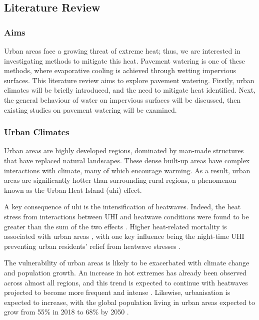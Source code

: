 \documentclass[final,3p,times,authoryear]{elsarticle}
\begin{document}
\subsection{Literature Review}\label{sec:appendix7.1}
\subsubsection{Aims}\label{sec:appendix7.1.1}

Urban areas face a growing threat of extreme heat; thus, we are interested in investigating methods to mitigate this heat. Pavement watering is one of these methods, where evaporative cooling is achieved through wetting impervious surfaces. This literature review aims to explore pavement watering. Firstly, urban climates will be briefly introduced, and the need to mitigate heat identified. Next, the general behaviour of water on impervious surfaces will be discussed, then existing studies on pavement watering will be examined.

\subsubsection{Urban Climates}\label{sec:appendix7.1.2}
Urban areas are highly developed regions, dominated by man-made structures that have
replaced natural landscapes. These dense built-up areas have complex interactions with
climate, many of which encourage warming. As a result, urban areas are significantly
hotter than surrounding rural regions, a phenomenon known as the Urban Heat Island
(\gls{uhi}) effect.

A key consequence of \gls{uhi} is the intensification of heatwaves. Indeed, the heat stress
from interactions between UHI and heatwave conditions were found to be greater than the sum of the two effects \citep{Li2013a}. Higher heat-related mortality is
associated with urban areas \citep{Heidari2020}, with one key influence being the
night-time UHI preventing urban residents' relief from heatwave stresses \citep{Clarke1972}.

The vulnerability of urban areas is likely to be exacerbated with climate change and
population growth. An increase in hot extremes has already been observed across
almost all regions, and this trend is expected to continue with heatwaves projected to
become more frequent and intense \citep{IPCC2021}. Likewise, urbanisation is expected to
increase, with the global population living in urban areas expected to grow from 55\% in
2018 to 68\% by 2050 \citep{UN2019}.
\end{document}
